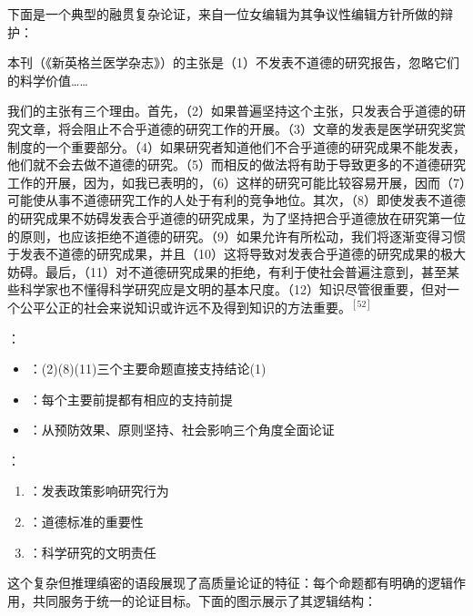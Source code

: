 下面是一个典型的融贯复杂论证，来自一位女编辑为其争议性编辑方针所做的辩护：

\begin{displayquote}
本刊（《新英格兰医学杂志》）的主张是（1）不发表不道德的研究报告，忽略它们的料学价值……

我们的主张有三个理由。首先，（2）如果普遍坚持这个主张，只发表合乎道德的研究文章，将会阻止不合乎道德的研究工作的开展。（3）文章的发表是医学研究奖赏制度的一个重要部分。（4）如果研究者知道他们不合乎道德的研究成果不能发表，他们就不会去做不道德的研究。（5）而相反的做法将有助于导致更多的不道德研究工作的开展，因为，如我已表明的，（6）这样的研究可能比较容易开展，因而（7）可能使从事不道德研究工作的人处于有利的竞争地位。其次，（8）即使发表不道德的研究成果不妨碍发表合乎道德的研究成果，为了坚持把合乎道德放在研究第一位的原则，也应该拒绝不道德的研究。（9）如果允许有所松动，我们将逐渐变得习惯于发表不道德的研究成果，并且（10）这将导致对发表合乎道德的研究成果的极大妨碍。最后，（11）对不道德研究成果的拒绝，有利于使社会普遍注意到，甚至某些科学家也不懂得科学研究应是文明的基本尺度。（12）知识尽管很重要，但对一个公平公正的社会来说知识或许远不及得到知识的方法重要。$^{[52]}$
\end{displayquote}

\begin{examplebox}[title=医学期刊编辑方针论证分析]
：
\begin{itemize}
  \item {}：(2)(8)(11)三个主要命题直接支持结论(1)
  \item {}：每个主要前提都有相应的支持前提
  \item {}：从预防效果、原则坚持、社会影响三个角度全面论证
\end{itemize}

：
\begin{enumerate}
  \item {}：发表政策影响研究行为
  \item {}：道德标准的重要性
  \item {}：科学研究的文明责任
\end{enumerate}
\end{examplebox}

这个复杂但推理缜密的语段展现了高质量论证的特征：每个命题都有明确的逻辑作用，共同服务于统一的论证目标。下面的图示展示了其逻辑结构：

